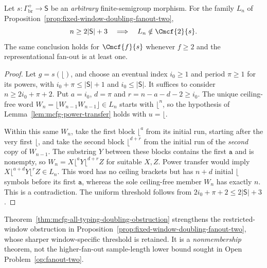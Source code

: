 \begin{theorem}
\label{thm:mcfg-all-typing-doubling-obstruction}
Let $s:\Gamma_{\mathrm{br}}^+\to\mathsf S$ be an
\emph{arbitrary} finite-semigroup morphism.
For the family $L_n$ of
Proposition~\ref{prop:fixed-window-doubling-fanout-two},
\[
 n\ge2|\mathsf S|+3\quad\Longrightarrow\quad
 L_n\notin\Cmcf{2}{s}.
\]
The same conclusion holds for $\Cmcf{f}{s}$ whenever
$f\ge2$ and the representational fan-out is at least one.
\end{theorem}
\begin{proof}
Let $g=s(\lfloor)$, and choose an eventual index
$i_0\ge1$ and period $\pi\ge1$ for its powers,
with $i_0+\pi\le |\mathsf S|+1$ and $i_0\le|\mathsf S|$.
It suffices to consider $n\ge2i_0+\pi+2$.
Put $a=i_0$, $d=\pi$ and $r=n-a-d-2\ge i_0$.
The unique ceiling-free word
$W_n=\lfloor W_{n-1}W_{n-1}\rfloor\in L_n$
starts with $\lfloor^n$, so the hypothesis of
Lemma~\ref{lem:mcfg-power-transfer} holds with $u=\lfloor$.

Within this same $W_n$, take the first block
$\lfloor^a$ from its initial run, starting after
the very first $\lfloor$, and take the second
block $\lfloor^{d+r}$ from the initial run of
the \emph{second} copy of $W_{n-1}$.
The substring $Y$ between these blocks contains
the first $\mathtt a$ and is nonempty, so
$W_n=X\lfloor^aY\lfloor^{d+r}Z$ for suitable $X,Z$.
Power transfer would imply
$X\lfloor^{a+d}Y\lfloor^rZ\in L_n$.
This word has no ceiling brackets but has $n+d$
initial $\lfloor$ symbols before its first $\mathtt a$,
whereas the sole ceiling-free member $W_n$ has
exactly $n$.  This is a contradiction.
The uniform threshold follows from
$2i_0+\pi+2\le2|\mathsf S|+3$.
\end{proof}

\begin{remark}
Theorem~\ref{thm:mcfg-all-typing-doubling-obstruction}
strengthens the restricted-window obstruction in
Proposition~\ref{prop:fixed-window-doubling-fanout-two},
whose sharper window-specific threshold is retained.
It is a \emph{nonmembership} theorem, not the
higher-fan-out sample-length lower bound sought in
Open Problem~\ref{op:fanout-two}.
\end{remark}

